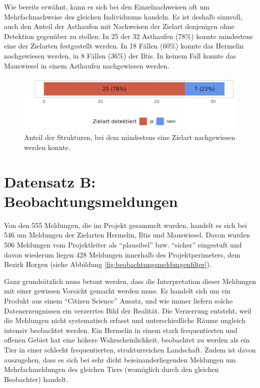 \documentclass[
  oneside]{scrbook}
\begin{document}
Wie bereits erwähnt, kann es sich bei den Einzelnachweisen oft um Mehrfachnachweise des gleichen Individuums handeln. Es ist deshalb sinnvoll, auch den Anteil der Asthaufen mit Nachweisen der Zielart denjenigen ohne Detektion gegenüber zu stellen: In 25 der 32 Asthaufen (78\%) konnte mindestens eine der Zielarten festgestellt werden. In 18 Fällen (60\%) konnte das Hermelin nachgewiesen werden, in 8 Fällen (36\%) der Iltis. In keinem Fall konnte das Mauswiesel in einem Asthaufen nachgewiesen werden.



\begin{figure}
\includegraphics[width=1\linewidth]{images/wirkungskontrolle_spontan_strukturen_mit_zielart} \caption{Anteil der Strukturen, bei dem mindestens eine Zielart nachgewiesen werden konnte.}\label{fig:wirkungskontrollespontanstrukturenmitzielart}
\end{figure}

\hypertarget{datensatz-b-beobachtungsmeldungen}{%
\section{Datensatz B: Beobachtungsmeldungen}\label{datensatz-b-beobachtungsmeldungen}}

Von den 555 Meldungen, die im Projekt gesammelt wurden, handelt es sich bei 546 um Meldungen der Zielarten Hermelin, Iltis und Mauswiesel. Davon wurden 506 Meldungen vom Projektleiter als ``plausibel'' bzw. ``sicher'' eingestuft und davon wiederum liegen 428 Meldungen innerhalb des Projektperimeters, dem Bezirk Horgen (siehe Abbildung \ref{fig:beobachtungsmeldungenfilter}).

Ganz grundsätzlich muss betont werden, dass die Interpretation dieser Meldungen mit einer gewissen Vorsicht gemacht werden muss. Es handelt sich um ein Produkt aus einem ``Citizen Science'' Ansatz, und wie immer liefern solche Datenerzeugnissen ein verzerrtes Bild der Realität. Die Verzerrung entsteht, weil die Meldungen nicht systematisch erfasst und unterschiedliche Räume ungleich intensiv beobachtet werden. Ein Hermelin in einem stark frequentierten und offenen Gebiet hat eine höhere Wahrscheinlichkeit, beobachtet zu werden als ein Tier in einer schlecht frequentierten, strukturreichen Landschaft. Zudem ist davon auszugehen, dass es sich bei sehr dicht beieinanderliegenden Meldungen um Mehrfachmeldungen des gleichen Tiers (womöglich durch den gleichen Beobachter) handelt.
\end{document}
